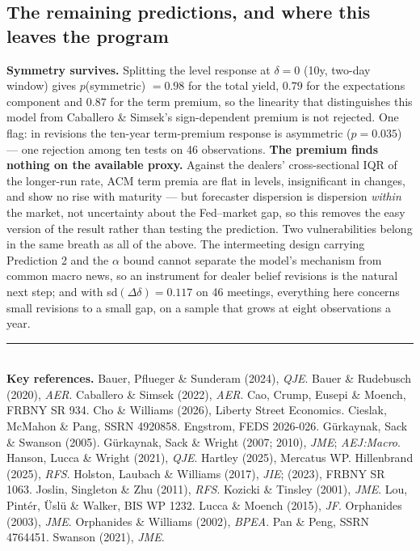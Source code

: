 \documentclass[11pt]{article}
\begin{document}
\subsection{The remaining predictions, and where this leaves the program}
\label{sec:test-rest}
\textbf{Symmetry survives.} Splitting the level response at $\delta=0$ (10y, two-day window)
gives $p$(symmetric) $=0.98$ for the total yield, $0.79$ for the expectations component and
$0.87$ for the term premium, so the linearity that distinguishes this model from Caballero \&
Simsek's sign-dependent premium is not rejected. One flag: in revisions the ten-year
term-premium response is asymmetric ($p=0.035$) --- one rejection among ten tests on 46
observations. \textbf{The premium finds nothing on the available proxy.} Against the dealers'
cross-sectional IQR of the longer-run rate, ACM term premia are flat in levels, insignificant in
changes, and show no rise with maturity --- but forecaster dispersion is dispersion \emph{within}
the market, not uncertainty about the Fed--market gap, so this removes the easy version of the
result rather than testing the prediction.
Two vulnerabilities belong in the same breath as all of the above. The intermeeting design
carrying Prediction 2 and the $\alpha$ bound cannot separate the model's mechanism from common
macro news, so an instrument for dealer belief revisions is the natural next step; and with
sd$(\Delta\delta)=0.117$ on 46 meetings, everything here concerns small revisions to a small
gap, on a sample that grows at eight observations a year.
\vspace{0.9em}
\noindent\rule{\textwidth}{0.4pt}\\[0.2em]
\scriptsize\textbf{Key references.} Bauer, Pflueger \& Sunderam (2024), \emph{QJE}. Bauer \&
Rudebusch (2020), \emph{AER}. Caballero \& Simsek (2022), \emph{AER}. Cao, Crump, Eusepi \&
Moench, FRBNY SR 934. Cho \& Williams (2026), Liberty Street Economics. Cieslak, McMahon \&
Pang, SSRN 4920858. Engstrom, FEDS 2026-026. G\"urkaynak, Sack \& Swanson (2005). G\"urkaynak,
Sack \& Wright (2007; 2010), \emph{JME}; \emph{AEJ:Macro}. Hanson,
Lucca \& Wright (2021), \emph{QJE}. Hartley (2025), Mercatus WP. Hillenbrand (2025),
\emph{RFS}. Holston, Laubach \& Williams (2017), \emph{JIE}; (2023), FRBNY SR 1063. Joslin,
Singleton \& Zhu (2011), \emph{RFS}. Kozicki \& Tinsley (2001), \emph{JME}. Lou, Pint\'er,
\"Usl\"u \& Walker, BIS WP 1232. Lucca \& Moench (2015), \emph{JF}. Orphanides (2003),
\emph{JME}. Orphanides \& Williams (2002), \emph{BPEA}. Pan \& Peng, SSRN 4764451. Swanson
(2021), \emph{JME}.
\end{document}
